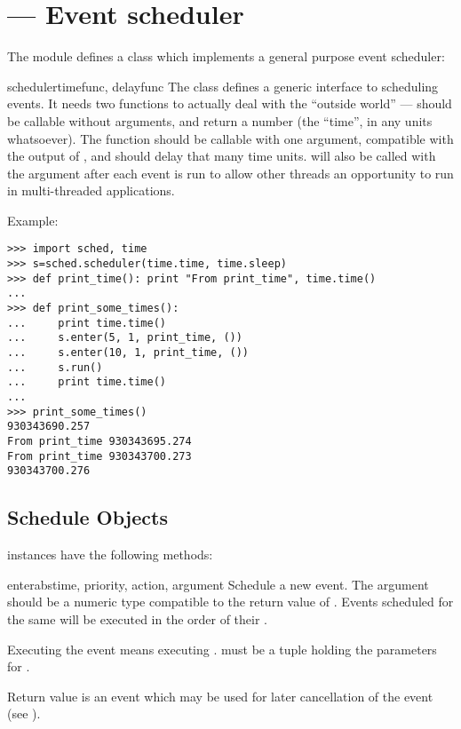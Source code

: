 \section{ ---
         Event scheduler}


The  module defines a class which implements a general
purpose event scheduler:

\begin{classdesc}{scheduler}{timefunc, delayfunc}
The  class defines a generic interface to scheduling
events. It needs two functions to actually deal with the ``outside world''
---  should be callable without arguments, and return 
a number (the ``time'', in any units whatsoever). The 
function should be callable with one argument, compatible with the output
of , and should delay that many time units.
 will also be called with the argument  after
each event is run to allow other threads an opportunity to run in
multi-threaded applications.
\end{classdesc}

Example:

\begin{verbatim}
>>> import sched, time
>>> s=sched.scheduler(time.time, time.sleep)
>>> def print_time(): print "From print_time", time.time()
...
>>> def print_some_times():
...     print time.time()
...     s.enter(5, 1, print_time, ())
...     s.enter(10, 1, print_time, ())
...     s.run()
...     print time.time()
...
>>> print_some_times()
930343690.257
From print_time 930343695.274
From print_time 930343700.273
930343700.276
\end{verbatim}


\subsection{Schedule Objects \label{schedule-objects}}

 instances have the following methods:

\begin{methoddesc}{enterabs}{time, priority, action, argument}
Schedule a new event. The  argument should be a numeric type
compatible to the return value of . Events scheduled for
the same  will be executed in the order of their
.

Executing the event means executing .   must be a tuple holding the
parameters for .

Return value is an event which may be used for later cancellation of
the event (see ).
\end{methoddesc}

